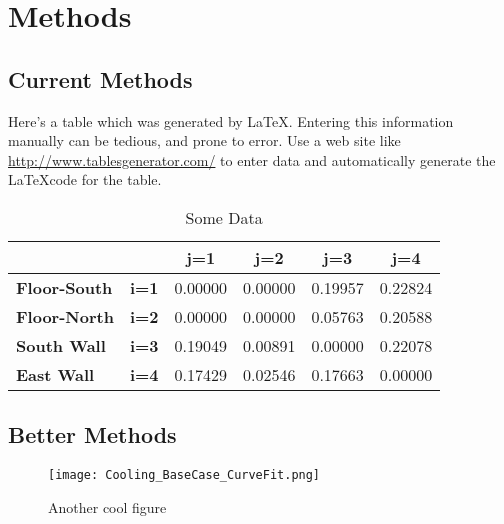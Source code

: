 \chapter{Methods}
\label{ch:Methods}

\section{Current Methods}

Here's a table which was generated by \LaTeX. Entering this information manually can be tedious, and prone to error. Use a web site like \url{http://www.tablesgenerator.com/} to enter data and automatically generate the \LaTeX code for the table.

\begin{table}[h]
\centering
\caption{Some Data}
\label{tab:data}
\begin{tabular}{|l|c|c|c|c|c|}
\hline
                     &              & \textbf{j=1} & \textbf{j=2} & \textbf{j=3} & \textbf{j=4} \\ \hline
\textbf{Floor-South} & \textbf{i=1} & 0.00000      & 0.00000      & 0.19957      & 0.22824      \\ \hline
\textbf{Floor-North} & \textbf{i=2} & 0.00000      & 0.00000      & 0.05763      & 0.20588      \\ \hline
\textbf{South Wall}  & \textbf{i=3} & 0.19049      & 0.00891      & 0.00000      & 0.22078      \\ \hline
\textbf{East Wall}   & \textbf{i=4} & 0.17429      & 0.02546      & 0.17663      & 0.00000      \\ \hline
\end{tabular}
\end{table}

\section{Better Methods}

\lipsum[1]

\begin{figure}
	\centering
	\texttt{[image: Cooling\_BaseCase\_CurveFit.png]}
	\caption{Another cool figure}
	\label{fig:another cool figure}
\end{figure}
